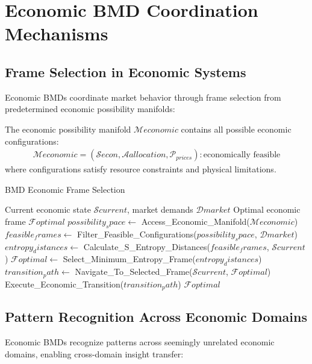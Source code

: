 \section{Economic BMD Coordination Mechanisms}

\subsection{Frame Selection in Economic Systems}

Economic BMDs coordinate market behavior through frame selection from predetermined economic possibility manifolds:

\begin{definition}
The economic possibility manifold $\mathcal{M}{economic}$ contains all possible economic configurations:
\begin{align}
\mathcal{M}{economic} = {(\mathcal{S}{econ}, \mathcal{A}{allocation}, \mathcal{P}_{prices}) : \text{economically feasible}}
\end{align}
where configurations satisfy resource constraints and physical limitations.
\end{definition}

\begin{algorithm}
\caption{BMD Economic Frame Selection}
\begin{algorithmic}[1]
\REQUIRE Current economic state $\mathcal{S}{current}$, market demands $\mathcal{D}{market}$
\ENSURE Optimal economic frame $\mathcal{F}{optimal}$
\STATE $possibility_space \leftarrow$ Access_Economic_Manifold($\mathcal{M}{economic}$)
\STATE $feasible_frames \leftarrow$ Filter_Feasible_Configurations($possibility_space$, $\mathcal{D}{market}$)
\STATE $entropy_distances \leftarrow$ Calculate_S_Entropy_Distances($feasible_frames$, $\mathcal{S}{current}$)
\STATE $\mathcal{F}{optimal} \leftarrow$ Select_Minimum_Entropy_Frame($entropy_distances$)
\STATE $transition_path \leftarrow$ Navigate_To_Selected_Frame($\mathcal{S}{current}$, $\mathcal{F}{optimal}$)
\STATE Execute_Economic_Transition($transition_path$)
\RETURN $\mathcal{F}{optimal}$
\end{algorithmic}
\end{algorithm}

\subsection{Pattern Recognition Across Economic Domains}

Economic BMDs recognize patterns across seemingly unrelated economic domains, enabling cross-domain insight transfer:

